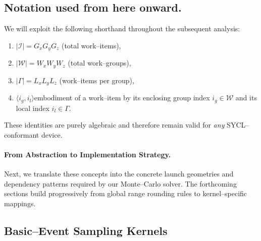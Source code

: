 \subsection*{Notation used from here onward.}  We will exploit the following shorthand throughout the subsequent analysis:
\begin{enumerate}
  \item $|\mathcal{I}|=G_xG_yG_z$ \quad (total work--items),
  \item $|\mathcal{W}|=W_xW_yW_z$ \quad (total work--groups),
  \item $|\Gamma|=L_xL_yL_z$        \quad (work--items per group),
  \item $\langle i_g,i_l\rangle$\quad embodiment of a work--item by its enclosing group index $i_g\in\mathcal{W}$ and its local index $i_l\in\Gamma$.
\end{enumerate}
These identities are purely algebraic and therefore remain valid for \emph{any} SYCL--conformant device.

\paragraph*{From Abstraction to Implementation Strategy.} Next, we translate these concepts into the concrete launch geometries and dependency patterns required by our Monte--Carlo solver.  The forthcoming sections build progressively from global range rounding rules to kernel--specific mappings.

\subsection{Basic--Event Sampling Kernels}
\label{subsec:be_kernel}

